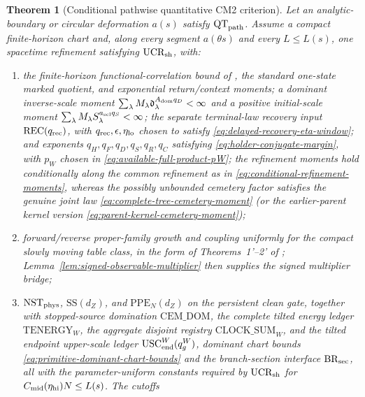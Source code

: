 \documentclass[11pt]{article}
\newtheorem{theorem}{Theorem}[section]
\begin{document}
\begin{theorem}[Conditional pathwise quantitative CM2 criterion]
\label{thm:global-cm2-assembly}
Let an analytic-boundary or circular deformation $a(s)$ satisfy
$\mathrm{QT}_{\rm path}$.
Assume a compact finite-horizon chart and, along every segment
$a(\theta s)$ and every $L\le L(s)$, one spacetime refinement satisfying
$\mathrm{UCR}_{\rm sh}$, with:
\begin{enumerate}[label=\textup{(H\arabic*)}]
\item the finite-horizon functional-correlation bound of \cite{LS}, the
      standard one-state marked quotient, and exponential return/context
      moments; a dominant inverse-scale moment
      $\sum_\lambda M_\lambda
      \mathfrak d_\lambda^{A_{\rm dom}q_D}<\infty$ and a positive initial-scale
      moment $\sum_\lambda M_\lambda
      S_\lambda^{a_{\rm scl}q_S}<\infty$; the separate terminal-law
      recovery input $\mathrm{REC}(q_{\rm rec})$, with
      $q_{\rm rec},\epsilon,\eta_{\rm lo}$ chosen to satisfy
      \eqref{eq:delayed-recovery-eta-window}; and
      exponents $q_H,q_F,q_D,q_S,q_R,q_C$ satisfying
      \eqref{eq:holder-conjugate-margin}, with $p_W$ chosen in
      \eqref{eq:available-full-product-pW}; the refinement moments hold
      conditionally along the common refinement as in
      \eqref{eq:conditional-refinement-moments}, whereas the possibly
      unbounded cemetery factor satisfies the genuine joint law
      \eqref{eq:complete-tree-cemetery-moment} (or the earlier-parent kernel
      version \eqref{eq:parent-kernel-cemetery-moment});
\item forward/reverse proper-family growth and coupling uniformly for the
      compact slowly moving table class, in the form of Theorems~1'--2' of
      \cite{SYZ}; Lemma~\ref{lem:signed-observable-multiplier} then supplies
      the signed multiplier bridge;
\item $\mathrm{NST}_{\rm phys}$, $\mathrm{SS}(d_Z)$, and
      $\mathrm{PPE}_{N}(d_Z)$ on the persistent clean gate, together with
      stopped-source domination $\mathrm{CEM\_DOM}$, the complete tilted
      energy ledger $\mathrm{TENERGY}_{W}$, the aggregate disjoint registry
      $\mathrm{CLOCK\_SUM}_{W}$, and the
      tilted endpoint upper-scale ledger $\mathrm{USC}_{\rm end}^{W}(q_g^W)$,
      dominant chart bounds \eqref{eq:primitive-dominant-chart-bounds} and
      the branch-section interface $\mathrm{BR}_{\rm sec}$, all with the
      parameter-uniform constants required by $\mathrm{UCR}_{\rm sh}$ for
      $C_{\rm mid}(\eta_{\rm hi})N\le L(s)$.  The cutoffs

\end{enumerate}
\end{theorem}
\end{document}
